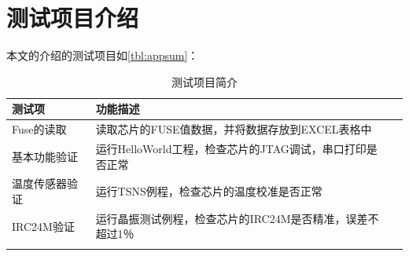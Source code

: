 \def\sectionabstract{测试简介}


\section{测试项目介绍} 
本文的介绍的测试项目如\autoref{tbl:appsum}：\par

\begin{center}    

    \begin{longtable}{|>{\raggedright\arraybackslash}m{3.5cm}
        |>{\raggedright\arraybackslash}m{10.5cm}
        |>{\raggedright\arraybackslash}m{3.5cm}|}
        \hline
		\textbf{测试项}    & \textbf{功能描述} \\\endhead
	\hline
    Fuse的读取 & 读取芯片的FUSE值数据，并将数据存放到EXCEL表格中 \\
    \hline
    基本功能验证 &  运行HelloWorld工程，检查芯片的JTAG调试，串口打印是否正常 \\
    \hline    
    温度传感器验证 &  运行TSNS例程，检查芯片的温度校准是否正常\\
	\hline	
    IRC24M验证 &  运行晶振测试例程，检查芯片的IRC24M是否精准，误差不超过1％\\
	\hline	
    \caption{测试项目简介}
    \label{tbl:appsum}
    \end{longtable}
\end{center}



